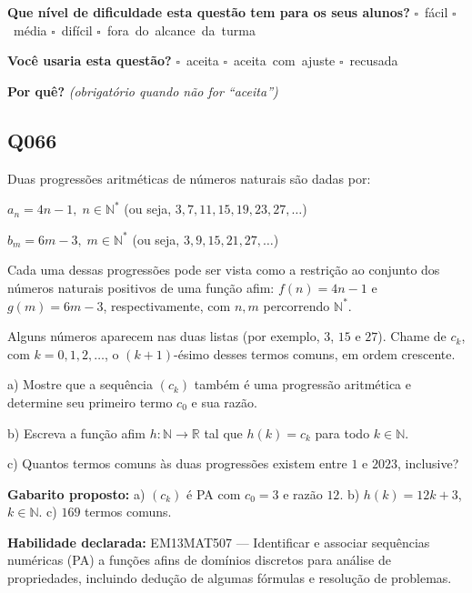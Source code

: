\documentclass[11pt,a4paper]{article}
\begin{document}
\textbf{Que nível de dificuldade esta questão tem para os seus alunos?}\quad
\mbox{$\square$~fácil} \quad \mbox{$\square$~média} \quad
\mbox{$\square$~difícil} \quad \mbox{$\square$~fora do alcance da turma}

\textbf{Você usaria esta questão?}\quad
\mbox{$\square$~aceita} \quad \mbox{$\square$~aceita com ajuste} \quad
\mbox{$\square$~recusada}

\textbf{Por quê?} \emph{(obrigatório quando não for ``aceita'')}

\underline{\hspace{\linewidth}}

\underline{\hspace{\linewidth}}
\vspace{0.6em}

\begin{samepage}
\subsection*{Q066}
Duas progressões aritméticas de números naturais são dadas por:

$a_n = 4n - 1,\; n \in \mathbb{N}^*$ (ou seja, $3, 7, 11, 15, 19, 23, 27, \dots$)

$b_m = 6m - 3,\; m \in \mathbb{N}^*$ (ou seja, $3, 9, 15, 21, 27, \dots$)

Cada uma dessas progressões pode ser vista como a restrição ao conjunto dos números naturais positivos de uma função afim: $f(n) = 4n-1$ e $g(m) = 6m-3$, respectivamente, com $n, m$ percorrendo $\mathbb{N}^*$.

Alguns números aparecem nas duas listas (por exemplo, $3$, $15$ e $27$). Chame de $c_k$, com $k = 0, 1, 2, \dots$, o $(k+1)$-ésimo desses termos comuns, em ordem crescente.

a) Mostre que a sequência $(c_k)$ também é uma progressão aritmética e determine seu primeiro termo $c_0$ e sua razão.

b) Escreva a função afim $h: \mathbb{N} \to \mathbb{R}$ tal que $h(k) = c_k$ para todo $k \in \mathbb{N}$.

c) Quantos termos comuns às duas progressões existem entre $1$ e $2023$, inclusive?

\textbf{Gabarito proposto:} a) $(c_k)$ é PA com $c_0=3$ e razão $12$. b) $h(k)=12k+3$, $k\in\mathbb{N}$. c) $169$ termos comuns.

\textbf{Habilidade declarada:} EM13MAT507 --- Identificar e associar sequências numéricas (PA) a funções afins de domínios discretos para análise de propriedades, incluindo dedução de algumas fórmulas e resolução de problemas.
\end{samepage}
\end{document}

